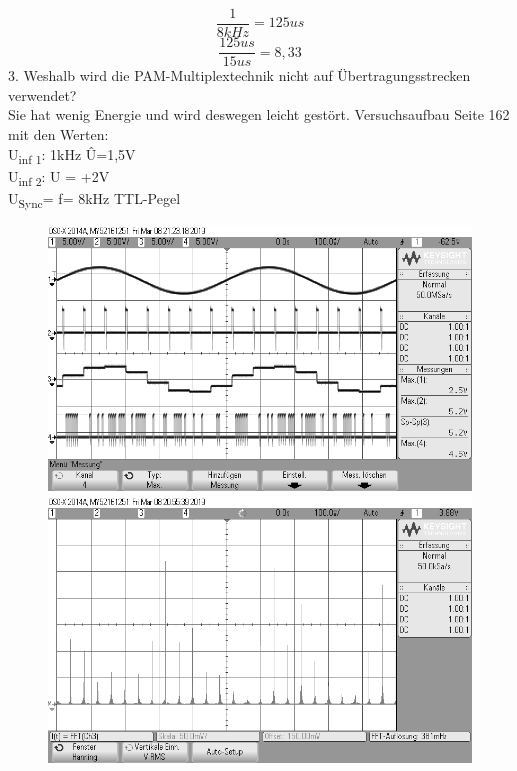 \documentclass[12pt,a4paper]{scrartcl}
\begin{document}
    \begin{equation}
		\frac{1}{8kHz} = 125us
	\end{equation}
	\begin{equation}
		\frac{125us}{15us} =8,33
	\end{equation}
	3. Weshalb wird die PAM-Multiplextechnik nicht auf Übertragungsstrecken verwendet?\\
Sie hat wenig Energie und wird deswegen leicht gestört.
\newpage
Versuchsaufbau Seite 162 mit den Werten:\\
U\textsubscript{inf 1}:  1kHz \^{U}=1,5V\\
U\textsubscript{inf 2}:  U = +2V\\
U\textsubscript{Sync}= f= 8kHz TTL-Pegel
      \begin{figure}[htbp]
    \begin{minipage}{0.48\textwidth}
     \centering
      \includegraphics[width=1\textwidth]{scope_25}
      \caption{}
      \label{fig:scope_25}
    \end{minipage}\hfill
    \begin{minipage}{0.48\textwidth}
     \centering
      \includegraphics[width=1\textwidth]{scope_24}
      \caption{}
      \label{fig:scope_24}
    \end{minipage}
  \end{figure} \\
\end{document}
